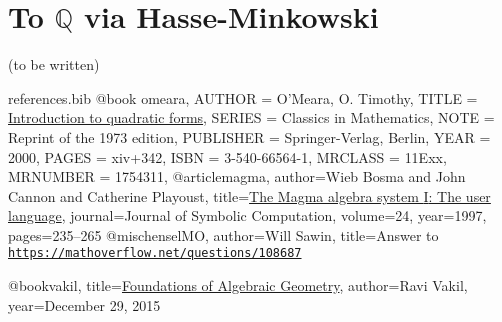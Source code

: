 \documentclass[10pt,a4paper]{amsart}
\numberwithin{equation}{section}
\numberwithin{figure}{section}
\theoremstyle{definition}
\theoremstyle{remark}
\theoremstyle{plain}
\theoremstyle{plain}
\theoremstyle{definition}
\theoremstyle{plain}
\theoremstyle{plain}
\begin{document}
    \section{To $\mathbb{Q}$ via Hasse-Minkowski}\label{sec:hasse-minkowski}
    
    (to be written)

\begin{filecontents}{references.bib}
@book {omeara,
    AUTHOR = {O'Meara, O. Timothy},
     TITLE = {\href{https://link.springer.com/book/10.1007\%2F978-3-642-62031-7}{Introduction to quadratic forms}},
    SERIES = {Classics in Mathematics},
      NOTE = {Reprint of the 1973 edition},
 PUBLISHER = {Springer-Verlag, Berlin},
      YEAR = {2000},
     PAGES = {xiv+342},
      ISBN = {3-540-66564-1},
   MRCLASS = {11Exx},
  MRNUMBER = {1754311},
}
@article{magma,
author={Wieb Bosma and John Cannon and Catherine Playoust},
title={\href{http://www.sciencedirect.com/science/article/pii/S074771719690125X}{The Magma algebra system {I}: The user language}},
journal={Journal of Symbolic Computation},
volume={24},
year={1997},
pages={235--265}
}
@misc{henselMO,
	author={Will Sawin},
	title={Answer to \href{https://mathoverflow.net/questions/108687}{\texttt{https://mathoverflow.net/questions/108687}}}
}

@book{vakil,
title={\href{http://math.stanford.edu/~vakil/216blog/index.html}{Foundations of Algebraic Geometry}},
author={Ravi Vakil},
year={December 29, 2015}
}
\end{filecontents}



\end{document}
